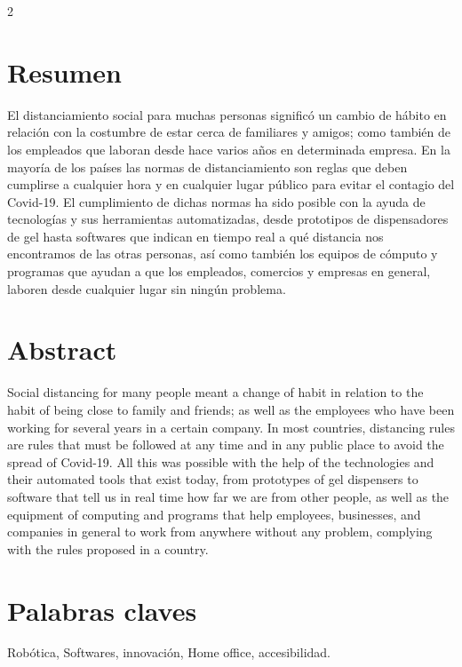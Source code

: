 \documentclass[12pt,spanish,Letterpaper,openany]{book}
\begin{document}
\begin {multicols}{2}

\hypertarget{resumen-7}{%
\section{Resumen}\label{resumen-7}}

El distanciamiento social para muchas personas significó un cambio de hábito en relación con la costumbre de estar cerca de familiares y amigos; como también de los empleados que laboran desde hace varios años en determinada empresa. En la mayoría de los países las normas de distanciamiento son reglas que deben cumplirse a cualquier hora y en cualquier lugar público para evitar el contagio del Covid-19. El cumplimiento de dichas normas ha sido posible con la ayuda de tecnologías y sus herramientas automatizadas, desde prototipos de dispensadores de gel hasta softwares que indican en tiempo real a qué distancia nos encontramos de las otras personas, así como también los equipos de cómputo y programas que ayudan a que los empleados, comercios y empresas en general, laboren desde cualquier lugar sin ningún problema.

\hypertarget{abstract-7}{%
\section{Abstract}\label{abstract-7}}

Social distancing for many people meant a change of habit in relation to the habit of being close to family and friends; as well as the employees who have been working for several years in a certain company. In most countries, distancing rules are rules that must be followed at any time and in any public place to avoid the spread of Covid-19. All this was possible with the help of the technologies and their automated tools that exist today, from prototypes of gel dispensers to software that tell us in real time how far we are from other people, as well as the equipment of computing and programs that help employees, businesses, and companies in general to work from anywhere without any problem, complying with the rules proposed in a country.

\hypertarget{palabras-claves-7}{%
\section{Palabras claves}\label{palabras-claves-7}}

Robótica, Softwares, innovación, Home office, accesibilidad.


\end{multicols}
\end{document}
